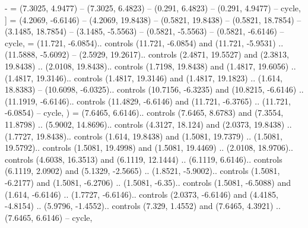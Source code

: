 {-} = {(7.3025, 4.9477) -- (7.3025, 6.4823) -- (0.291, 6.4823) -- (0.291, 4.9477) -- cycle},
{]} = {(4.2069, -6.6146) -- (4.2069, 19.8438) -- (0.5821, 19.8438) -- (0.5821, 18.7854) -- (3.1485, 18.7854) -- (3.1485, -5.5563) -- (0.5821, -5.5563) -- (0.5821, -6.6146) -- cycle},
{\ctpbackslash} = {(11.721, -6.0854).. controls (11.721, -6.0854) and (11.721, -5.9531) .. (11.5888, -5.6092) -- (2.5929, 19.2617).. controls (2.4871, 19.5527) and (2.3813, 19.8438) .. (2.0108, 19.8438).. controls (1.7198, 19.8438) and (1.4817, 19.6056) .. (1.4817, 19.3146).. controls (1.4817, 19.3146) and (1.4817, 19.1823) .. (1.614, 18.8383) -- (10.6098, -6.0325).. controls (10.7156, -6.3235) and (10.8215, -6.6146) .. (11.1919, -6.6146).. controls (11.4829, -6.6146) and (11.721, -6.3765) .. (11.721, -6.0854) -- cycle},
{)} = {(7.6465, 6.6146).. controls (7.6465, 8.6783) and (7.3554, 11.8798) .. (5.9002, 14.8696).. controls (4.3127, 18.124) and (2.0373, 19.8438) .. (1.7727, 19.8438).. controls (1.614, 19.8438) and (1.5081, 19.7379) .. (1.5081, 19.5792).. controls (1.5081, 19.4998) and (1.5081, 19.4469) .. (2.0108, 18.9706).. controls (4.6038, 16.3513) and (6.1119, 12.1444) .. (6.1119, 6.6146).. controls (6.1119, 2.0902) and (5.1329, -2.5665) .. (1.8521, -5.9002).. controls (1.5081, -6.2177) and (1.5081, -6.2706) .. (1.5081, -6.35).. controls (1.5081, -6.5088) and (1.614, -6.6146) .. (1.7727, -6.6146).. controls (2.0373, -6.6146) and (4.4185, -4.8154) .. (5.9796, -1.4552).. controls (7.329, 1.4552) and (7.6465, 4.3921) .. (7.6465, 6.6146) -- cycle},
